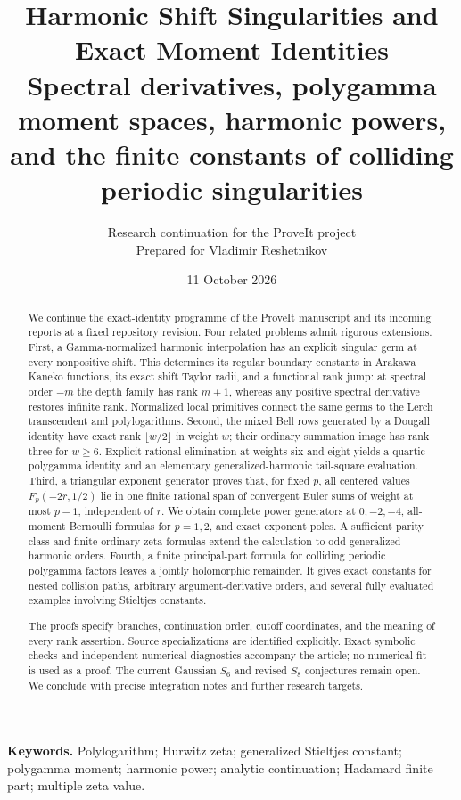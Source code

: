 \documentclass[11pt,a4paper]{article}
\title{\textbf{Harmonic Shift Singularities and Exact Moment Identities}\\[5pt]
\large Spectral derivatives, polygamma moment spaces, harmonic powers,\\
and the finite constants of colliding periodic singularities}
\author{Research continuation for the ProveIt project\\
\small Prepared for Vladimir Reshetnikov}
\date{11 October 2026}
\numberwithin{equation}{section}
\theoremstyle{definition}
\theoremstyle{remark}
\begin{document}
\maketitle
\begin{abstract}
We continue the exact-identity programme of the ProveIt manuscript and
its incoming reports at a fixed repository revision. Four related
problems admit rigorous extensions. First, a Gamma-normalized harmonic
interpolation has an explicit singular germ at every nonpositive shift.
This determines its regular boundary constants in Arakawa--Kaneko
functions, its exact shift Taylor radii, and a functional rank jump:
at spectral order $-m$ the depth family has rank $m+1$, whereas any
positive spectral derivative restores infinite rank. Normalized local
primitives connect the same germs to the Lerch transcendent and
polylogarithms. Second, the mixed Bell rows generated by a Dougall
identity have exact rank $\lfloor w/2\rfloor$ in weight $w$; their
ordinary summation image has rank three for $w\ge6$. Explicit rational
elimination at weights six and eight yields a quartic polygamma
identity and an elementary generalized-harmonic tail-square evaluation.
Third, a triangular exponent generator proves that, for fixed $p$,
all centered values $F_p(-2r,1/2)$ lie in one finite rational span of
convergent Euler sums of weight at most $p-1$, independent of $r$.
We obtain complete power generators at $0,-2,-4$, all-moment Bernoulli
formulas for $p=1,2$, and exact exponent poles. A sufficient parity
class and finite ordinary-zeta formulas extend the calculation to
odd generalized harmonic orders. Fourth, a finite
principal-part formula for colliding periodic polygamma factors leaves
a jointly holomorphic remainder. It gives exact constants for nested
collision paths, arbitrary argument-derivative orders, and several
fully evaluated examples involving Stieltjes constants.

The proofs specify branches, continuation order, cutoff coordinates,
and the meaning of every rank assertion. Source specializations are
identified explicitly. Exact symbolic checks and independent numerical
diagnostics accompany the article; no numerical fit is used as a proof.
The current Gaussian $S_6$ and revised $S_8$ conjectures remain open.
We conclude with precise integration notes and further research targets.
\end{abstract}

\noindent\textbf{Keywords.}
Polylogarithm; Hurwitz zeta; generalized Stieltjes constant;
polygamma moment; harmonic power; analytic continuation;
Hadamard finite part; multiple zeta value.
\end{document}
